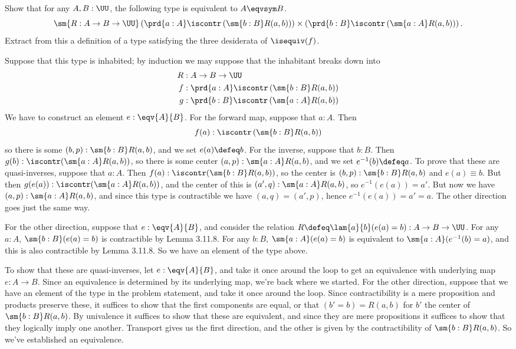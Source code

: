 Show that for any $A, B : \UU$, the following type is equivalent to $A \eqvsym
B$.
\[
  \sm{R : A \to B \to \UU}
  \left(\prd{a:A} \iscontr \left(\sm{b:B} R(a, b)\right)\right)
  \times
  \left(\prd{b:B} \iscontr \left(\sm{a:A} R(a, b)\right)\right).
\]
Extract from this a definition of a type satisfying the three desiderata of
$\isequiv(f)$.


 \soln
Suppose that this type is inhabited; by induction we may suppose that the
inhabitant breaks down into
\begin{align*}
  R &: A \to B \to \UU \\
  f &: \prd{a:A} \iscontr\left(\sm{b:B}R(a, b)\right) \\
  g &: \prd{b:B} \iscontr\left(\sm{a:A}R(a, b)\right)
\end{align*}
We have to construct an element $e : \eqv{A}{B}$.  For the forward map, suppose
that $a : A$.  Then
\[
  f(a) : \iscontr\left(\sm{b:B}R(a, b)\right)
\]
so there is some $(b, p) : \sm{b:B}R(a,b)$, and we set $e(a) \defeq b$.  For
the inverse, suppose that $b:B$.  Then $g(b) : \iscontr(\sm{a:A}R(a, b))$, so
there is some center $(a, p) : \sm{a:A}R(a,b)$, and we set $e^{-1}(b) \defeq
a$.  To prove that these are quasi-inverses, suppose that $a : A$.  Then $f(a)
: \iscontr(\sm{b:B}R(a,b))$, so the center is $(b, p) : \sm{b:B}R(a,b)$ and
$e(a) \equiv b$.  But then $g(e(a)) : \iscontr(\sm{a:A}R(a, b))$, and the
center of this is $(a', q) : \sm{a:A}R(a,b)$, so $e^{-1}(e(a)) = a'$.  But
now we have $(a, p) : \sm{a:A}R(a, b)$, and since this type is contractible we
have $(a, q) = (a', p)$, hence $e^{-1}(e(a)) = a' = a$.  The other direction
goes just the same way.


For the other direction, suppose that $e : \eqv{A}{B}$, and consider the
relation $R \defeq \lam{a}{b}(e(a) = b) : A \to B \to \UU$.  For any $a : A$,
$\sm{b:B}(e(a) = b)$ is contractible by Lemma 3.11.8.  For any $b:B$,
$\sm{a:A}(e(a) = b)$ is equivalent to $\sm{a:A}(e^{-1}(b) = a)$, and this is
also contractible by Lemma 3.11.8.  So we have an element of the type above.


To show that these are quasi-inverses, let $e : \eqv{A}{B}$, and take it once
around the loop to get an equivalence with underlying map $e : A \to B$.  Since
an equivalence is determined by its underlying map, we're back where we
started.  For the other direction, suppose that we have an element of the type
in the problem statement, and take it once around the loop.  Since
contractibility is a mere proposition and products preserve these, it suffices
to show that the first components are equal, or that $(b' = b) = R(a, b)$ for
$b'$ the center of $\sm{b:B}R(a, b)$.  By univalence it suffices to show that
these are equivalent, and since they are mere propositions it suffices to show
that they logically imply one another.  Transport gives us the first
direction, and the other is given by the contractibility of $\sm{b:B}R(a, b)$.
So we've established an equivalence.


